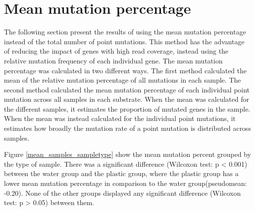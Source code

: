 \section{Mean mutation percentage}
The following section present the results of using the mean mutation percentage instead of the total number of point mutations.
This method has the advantage of reducing the impact of genes with high read coverage, instead using the relative mutation frequency of each individual gene.
The mean mutation percentage was calculated in two different ways.
The first method calculated the mean of the relative mutation percentage of all mutations in each sample.
The second method calculated the mean mutation percentage of each individual point mutation across all samples in each substrate.
When the mean was calculated for the different samples, it estimates the proportion of mutated genes in the sample.
When the mean was instead calculated for the individual point mutations, it estimates how broadly the mutation rate of a point mutation is distributed across samples. 


Figure \ref{mean_samples_sampletype} show the mean mutation percent grouped by the type of sample.
There was a significant difference (Wilcoxon test: p < 0.001) between the water group and the plastic group, where the plastic group has a lower mean mutation percentage in comparison to the water group(pseudomean: -0.20). None of the other groups displayed any significant difference (Wilcoxon test: p > 0.05) between them.

